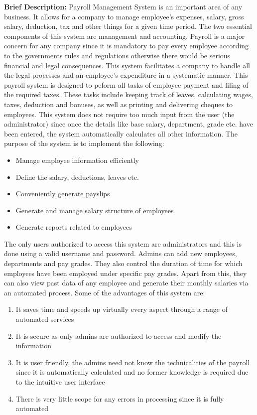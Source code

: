 \documentclass[12pt]{article}
\begin{document}
\noindent
\textbf{Brief Description:}
\newline
\newline
Payroll Management System is an important area of any business. It allows for a company to manage employee's expenses, salary, gross salary, deduction, tax and other things for a given time period. The two essential components of this system are management and accounting. Payroll is a major concern for any company since it is mandatory to pay every employee according to the governments rules and regulations otherwise there would be serious financial and legal consequences. This system facilitates a company to handle all the legal processes and an employee's expenditure in a systematic manner.
\newline
\newline
This payroll system is designed to peform all tasks of employee payment and filing of the required taxes. These tasks include keeping track of leaves, calculating wages, taxes, deduction and bonuses, as well as printing and delivering cheques to employees. This system does not require too much input from the user (the administrator) since once the details like base salary, department, grade etc. have been entered, the system automatically calculates all other information.
\newline
\newline
The purpose of the system is to implement the following:
\begin{itemize}
    \item Manage employee information efficiently
    \item Define the salary, deductions, leaves etc.
    \item Conveniently generate payslips
    \item Generate and manage salary structure of employees
    \item Generate reports related to employees
\end{itemize}
\noindent
The only users authorized to access this system are administrators and this is done using a valid username and password. Admins can add new employees, departments and pay grades. They also control the duration of time for which employees have been employed under specific pay grades. Apart from this, they can also view past data of any employee and generate their monthly salaries via an automated process.
\newline
\newline
\noindent
Some of the advantages of this system are:
\begin{enumerate}
    \item It saves time and speeds up virtually every aspect through a range of automated services
    \item It is secure as only admins are authorized to access and modify the information
    \item It is user friendly, the admins need not know the technicalities of the payroll since it is automatically calculated and no former knowledge is required due to the intuitive user interface
    \item There is very little scope for any errors in processing since it is fully automated
\end{enumerate}
\end{document}
